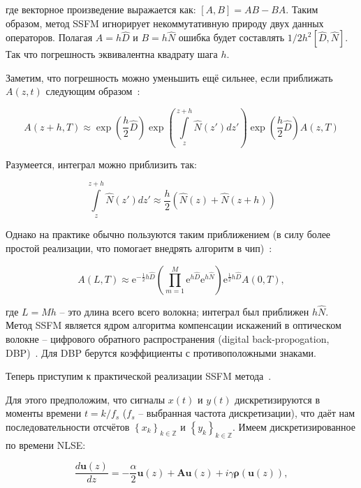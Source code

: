 где векторное произведение выражается как: $\left[ A, B \right] = AB - BA$. Таким образом, метод SSFM игнорирует некоммутативную природу двух данных операторов.
Полагая $A = h\hat{D}$ и $B = h\hat{N}$ ошибка будет составлять $1/2 h^2 \left[ \hat{D}, \hat{N} \right]$. Так что погрешность эквивалентна квадрату шага $h$.

Заметим, что погрешность можно уменьшить ещё сильнее, если приближать $A(z, t)$ следующим образом~\cite{agrawal2007nonlinear}:

\begin{equation}
	A(z + h, T) \approx \exp{\left( \frac{h}{2} \hat{D} \right)} \exp{\left( \int \limits_{z}^{z+h} \hat{N}(z')dz' \right)} \exp{\left( \frac{h}{2} \hat{D} \right)} A(z, T)
\end{equation}

Разумеется, интеграл можно приблизить так:

\begin{equation}
	\int \limits_{z}^{z+h} \hat{N}(z')dz' \approx \frac{h}{2} \left( \hat{N}(z) + \hat{N}(z + h) \right)
\end{equation}

Однако на практике обычно пользуются таким приближением (в силу более простой реализации, что помогает внедрять алгоритм в чип)~\cite{Sinkin2003}:

\begin{equation}
	A(L, T) \approx \text{e}^{-\frac{1}{2}h\hat{D}} \left( \prod \limits_{m=1}^M \text{e}^{h\hat{D}} \text{e}^{h\hat{N}} \right) \text{e}^{\frac{1}{2}h\hat{D}} A(0, T),
\end{equation}

где $L = Mh$ -- это длина всего всего волокна; интеграл был приближен $h\hat{N}$.
Метод SSFM является ядром алгоритма компенсации искажений в оптическом волокне -- цифрового обратного распространения (digital back-propogation, DBP)~\cite{dbp4738549}.
Для DBP берутся коэффициенты с противоположными знаками.

Теперь приступим к практической реализации SSFM метода~\cite{hager2020}.

Для этого предположим, что сигналы $x(t)$ и $y(t)$ дискретизируются в моменты времени $t=k/f_s$ ($f_s$ -- выбранная частота дискретизации),
что даёт нам последовательности отсчётов $\left\{ x_k \right\}_{k \in \mathbb{Z}}$ и $\left\{ y_k \right\}_{k \in \mathbb{Z}}$.
Имеем дискретизированное по времени NLSE:

\begin{equation}
	\frac{d \mathbf{u}(z)}{dz} = -\frac{\alpha}{2} \mathbf{u}(z) + \mathbf{A} \mathbf{u}(z) + i \gamma \mathbf{\rho} (\mathbf{u}(z)),
\end{equation}

